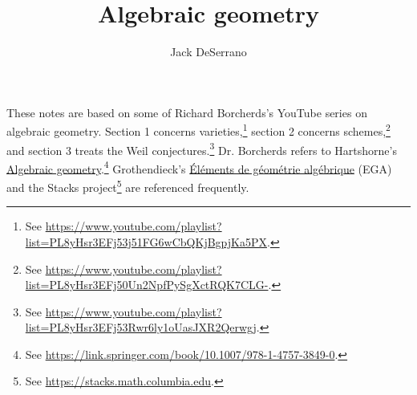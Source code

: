 \documentclass [11 pt, oneside] {article}
\title {Algebraic geometry}
\author {Jack DeSerrano}
\begin{document}
\ifams
    \vspace*{\fill}
\fi
\maketitle
\thispagestyle{empty}
These notes are based on some of Richard Borcherds's YouTube series on algebraic geometry. 
Section 1 concerns varieties,\footnote{See \url{https://www.youtube.com/playlist?list=PL8yHsr3EFj53j51FG6wCbQKjBgpjKa5PX}.} 
section 2 concerns schemes,\footnote{See \url{https://www.youtube.com/playlist?list=PL8yHsr3EFj50Un2NpfPySgXctRQK7CLG-}.} 
and section 3 treats the Weil conjectures.\footnote{See \url{https://www.youtube.com/playlist?list=PL8yHsr3EFj53Rwr6ly1oUasJXR2Qerwgj}.} 
Dr. Borcherds refers to Hartshorne's \ul{Algebraic geometry}.\footnote{See \url{https://link.springer.com/book/10.1007/978-1-4757-3849-0}.} 
Grothendieck's \ul{\'El\'ements de g\'eom\'etrie alg\'ebrique} (EGA) and the Stacks project\footnote{See \url{https://stacks.math.columbia.edu}.} are referenced frequently.
\hypersetup{linkcolor = black}
\end{document}
